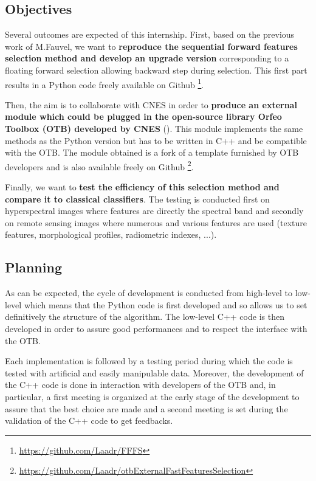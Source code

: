 \documentclass[a4paper,11pt,DIV=16,abstracton]{scrartcl}
\begin{document}
    \subsection{Objectives}

    Several outcomes are expected of this internship. First, based on the previous work \cite{fauvel2015fast} of M.Fauvel, we want to {\bfseries reproduce the sequential forward features selection method and develop an upgrade version} corresponding to a floating forward selection allowing backward step during selection. This first part results in a Python code freely available on Github \footnote{\url{https://github.com/Laadr/FFFS}}.

    Then, the aim is to collaborate with CNES in order to {\bfseries produce an external module which could be plugged in the open-source library Orfeo Toolbox (OTB) developed by CNES} (\cite{christophe2008orfeo}). This module implements the same methods as the Python version but has to be written in C++ and be compatible with the OTB. The module obtained is a fork of a template furnished by OTB developers and is also available freely on Github \footnote{\url{https://github.com/Laadr/otbExternalFastFeaturesSelection}}.

    Finally, we want to {\bfseries test the efficiency of this selection method and compare it to classical classifiers}. The testing is conducted first on hyperspectral images where features are directly the spectral band and secondly on remote sensing images where numerous and various features are used (texture features, morphological profiles, radiometric indexes, ...).

    \subsection{Planning}

    As can be expected, the cycle of development is conducted from high-level to low-level which means that the Python code is first developed and so allows us to set definitively the structure of the algorithm. The low-level C++ code is then developed in order to assure good performances and to respect the interface with the OTB.

    Each implementation is followed by a testing period during which the code is tested with artificial and easily manipulable data. Moreover, the development of the C++ code is done in interaction with developers of the OTB and, in particular, a first meeting is organized at the early stage of the development to assure that the best choice are made and a second meeting is set during the validation of the C++ code to get feedbacks.
\end{document}
